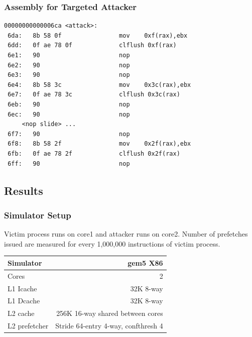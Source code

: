 \documentclass[10pt]{beamer}
\begin{document}
\begin{frame}[fragile]
\frametitle{Assembly for Targeted Attacker}
\begin{lstlisting}[caption={Attacker targeting specific PC addresses},
label={lst:targeted_attack}]
00000000000006ca <attack>:
 6da:   8b 58 0f                mov    0xf(rax),ebx
 6dd:   0f ae 78 0f             clflush 0xf(rax)
 6e1:   90                      nop
 6e2:   90                      nop
 6e3:   90                      nop
 6e4:   8b 58 3c                mov    0x3c(rax),ebx
 6e7:   0f ae 78 3c             clflush 0x3c(rax)
 6eb:   90                      nop
 6ec:   90                      nop
     <nop slide> ...
 6f7:   90                      nop
 6f8:   8b 58 2f                mov    0x2f(rax),ebx
 6fb:   0f ae 78 2f             clflush 0x2f(rax)
 6ff:   90                      nop
\end{lstlisting}
\end{frame}

\subsection{Results}

\begin{frame}[fragile]
\frametitle{Simulator Setup}

Victim process runs on core1 and attacker runs on core2. Number of prefetches
issued are measured for every 1,000,000 instructions of victim process.
\vspace{0.1in}
\begin{tabular}{|l|r|}
    \hline
    Simulator  & gem5 X86\\
    \hline
    Cores  & 2\\
    \hline
    L1 Icache & 32K 8-way\\
    \hline
    L1 Dcache & 32K 8-way\\
    \hline
    L2 cache & 256K 16-way shared between cores\\
    \hline
    L2 prefetcher  & Stride 64-entry 4-way, confthresh 4\\
    \hline
\end{tabular}
\end{frame}
\end{document}
